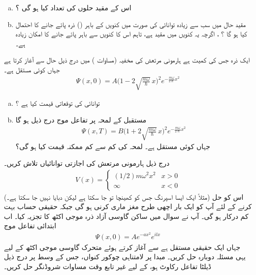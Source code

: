 \begin{enumerate}[a.]
\item
 اس کے مقید حلوں کی تعداد کیا ہو گی ؟
\item 
 مقید حال میں سب سے زیادہ توانائی کی صورت میں کنویں کے باہر () ذرہ پائے جانے کا احتمال کیا ہو گا ؟
 ، اگرچہ یہ کنویں میں مقید ہے، تاہم اس کا کنویں سے باہر پائے جانے کا امکان زیادہ ہے۔ 
\end{enumerate}
ایک ذرہ جس کی کمیت ہے ہارمونی مرتعش کی مخفیہ (مساوات ) میں درج ذیل حال سے آغاز کرتا ہے جہاں کوئی مستقل ہے۔
\begin{align*}
\Psi(x,0)=A\Big(1-2\sqrt{\frac{m\omega}{\hslash}}\, x \Big)^{2}e^{-\frac{m\omega}{2\hslash}x^{2}}
\end{align*}
%
\begin{enumerate}[a.]
\item
 توانائی کی توقعاتی قیمت کیا ہے ؟
\item
مستقبل کے لمحہ  پر تفاعل موج درج ذیل ہو گا
\begin{align*}
\Psi(x,T)=B\Big(1+2\sqrt{\frac{m\omega}{\hslash}}\,x \Big)^{2}e^{-\frac{m\omega}{2\hslash}x^{2}} 
\end{align*}
 جہاں  کوئی مستقل ہے۔ لمحہ  کی کم سے کم ممکنہ قیمت کیا ہو گی؟ 
\end{enumerate}
درج ذیل  ہارمونی مرتعش کی اجازتی توانائیاں تلاش کریں۔
\begin{align*}
V(x)=
\begin{cases}
(1/2)m\omega^{2}x^{2}&x> 0\\
\infty & x< 0
\end{cases}
 \end{align*}
(مثلاً ایک ایسا اسپرنگ جس کو کھینچا تو جا سکتا ہے لیکن دبایا نہیں جا سکتا ہے۔)  اس کو حل کرنے کے لئے آپ کو ایک بار اچھی طرح مغز ماری کرنی ہو گی جبکہ حقیقی حساب بہت کم درکار ہو گی۔ 
آپ نے سوال  میں ساکن گاوسی آزاد ذرہ موجی اکٹھ کا تجزیہ کیا۔ اب ابتدائی تفاعل موج 
\begin{align*}
\Psi(x,0)=Ae^{-ax^{2}}e^{ilx} 
\end{align*} 
 جہاں ایک حقیقی مستقل ہے سے آغاز کرتے ہوئے متحرک گاوسی موجی اکٹھ کے لیے یہی مسئلہ دوبارہ حل کریں۔
مبدا پر لامتناہی چوکور کنواں، جس کے وسط پر درج ذیل ڈیلٹا تفاعل رکاوٹ ہو، کے لیے غیر تابع وقت مساوات شروڈنگر حل کریں۔
